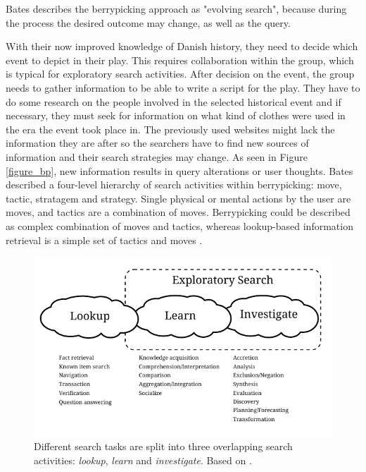 Bates \cite{bates89} describes the berrypicking approach as "evolving search", because during the process the desired outcome may change, as well as the query.

With their now improved knowledge of Danish history, they need to decide which event to depict in their play.
This requires collaboration within the group, which is typical for exploratory search activities.
After decision on the event, the group needs to gather information to be able to write a script for the play.
They have to do some research on the people involved in the selected historical event and if necessary, they must seek for information on what kind of clothes were used in the era the event took place in.
The previously used websites might lack the information they are after so the searchers have to find new sources of information and their search strategies may change.
As seen in Figure \ref{figure_bp}, new information results in query alterations or user thoughts.
Bates \cite{bates90} described a four-level hierarchy of search activities within berrypicking: move, tactic, stratagem and strategy.
Single physical or mental actions by the user are moves, and tactics are a combination of moves. 
Berrypicking could be described as complex combination of moves and tactics, whereas lookup-based information retrieval is a simple set of tactics and moves \cite{white09}.

\begin{figure}[htp] %
\caption{Different search tasks are split into three overlapping search activities: \textit{lookup}, \textit{learn} and \textit{investigate}. Based on \protect\cite{march06}.}
\label{figure_3clouds}
\centering
\includegraphics[scale=0.8]{figures/3clouds2.pdf}
\end{figure}


